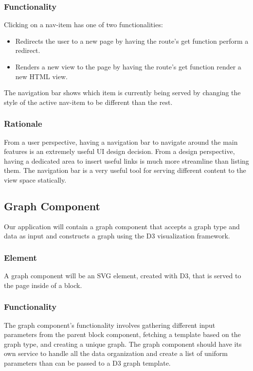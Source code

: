\documentclass[journal,10pt,onecolumn,compsoc]{IEEEtran}
\begin{document}
    \subsubsection{Functionality}
    Clicking on a nav-item has one of two functionalities: 
    \begin{itemize}
        \item Redirects the user to a new page by having the route's get function perform a redirect.
        \item Renders a new view to the page by having the route's get function render a new HTML view.
    \end{itemize}
	The navigation bar shows which item is currently being served by changing the style of the active nav-item to be different than the rest.
	\subsubsection{Rationale}
    From a user perspective, having a navigation bar to navigate around the main features is an extremely useful UI design decision. From a design perspective, having a dedicated area to insert useful links is much more streamline than listing them. The navigation bar is a very useful tool for serving different content to the view space statically.
    \subsection{Graph Component}
    Our application will contain a graph component that accepts a graph type and data as input and constructs a graph using the D3 visualization framework.
    \subsubsection{Element}
    A graph component will be an SVG element, created with D3, that is served to the page inside of a block. 
    \subsubsection{Functionality}
    The graph component's functionality involves gathering different input parameters from the parent block component, fetching a template based on the graph type, and creating a unique graph. The graph component should have its own service to handle all the data organization and create a list of uniform parameters than can be passed to a D3 graph template.
\end{document}
